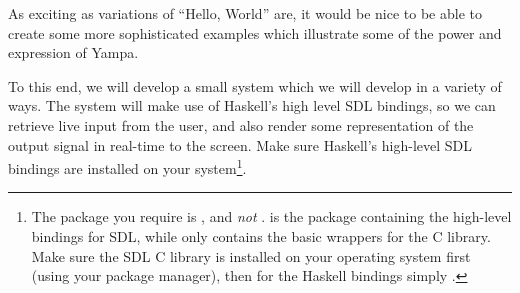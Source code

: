 As exciting as variations of ``Hello, World'' are, it would be nice to be able to create some more sophisticated examples which illustrate some of the power and expression of Yampa.

To this end, we will develop a small system which we will develop in a variety of ways.  The system will make use of Haskell's high level SDL bindings, so we can retrieve live input from the user, and also render some representation of the output signal in real-time to the screen. Make sure Haskell's high-level SDL bindings are installed on your system\footnote{The package you require is , and \emph{not} .  is the package containing the high-level bindings for SDL, while  only contains the basic wrappers for the C library. Make sure the SDL C library is installed on your operating system first (using your package manager), then for the Haskell bindings simply .}.


